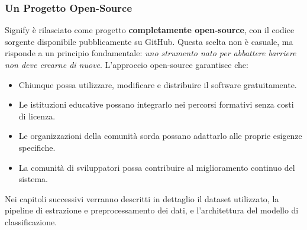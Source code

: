 \subsubsection{Un Progetto Open-Source}

Signify è rilasciato come progetto \textbf{completamente open-source}, con il codice sorgente disponibile pubblicamente su GitHub. Questa scelta non è casuale, ma risponde a un principio fondamentale: \textit{uno strumento nato per abbattere barriere non deve crearne di nuove}. L'approccio open-source garantisce che:
\begin{itemize}
    \item Chiunque possa utilizzare, modificare e distribuire il software gratuitamente.
    \item Le istituzioni educative possano integrarlo nei percorsi formativi senza costi di licenza.
    \item Le organizzazioni della comunità sorda possano adattarlo alle proprie esigenze specifiche.
    \item La comunità di sviluppatori possa contribuire al miglioramento continuo del sistema.
\end{itemize}

Nei capitoli successivi verranno descritti in dettaglio il dataset utilizzato, la pipeline di estrazione e preprocessamento dei dati, e l'architettura del modello di classificazione.